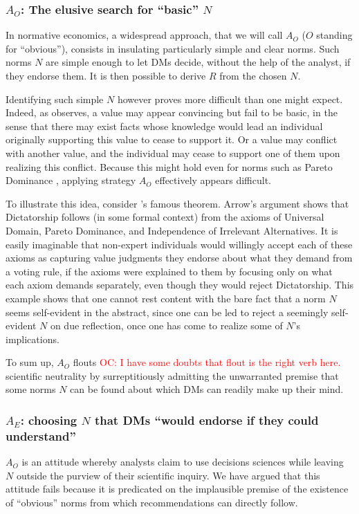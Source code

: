 \documentclass[preprint, french, english, 11pt, authoryear]{elsarticle}%
\newcommand{\protectforpdf}[1]{\texorpdfstring{\ensuremath{#1}}{#1}}
\newcommand{\commentOC}[1]{\textcolor{red}{OC: #1}}
\begin{document}
\subsubsection{\texorpdfstring{$A_O$}{AO}: The elusive search for ``basic'' \protectforpdf{N}}
In normative economics, a widespread approach, that we will call $A_O$ ($O$ standing for “obvious”), consists in insulating particularly simple and clear norms. Such norms $N$ are simple enough to let \acp{DM} decide, without the help of the analyst, if they endorse them. It is then possible to derive $R$ from the chosen $N$.

Identifying such simple $N$ however proves more difficult than one might expect. Indeed, as \citet{sen_nature_1967} observes, a value may appear convincing but fail to be basic, in the sense that there may exist facts whose knowledge would lead an individual originally supporting this value to cease to support it. Or a value may conflict with another value, and the individual may cease to support one of them upon realizing this conflict. Because this might hold even for norms such as Pareto Dominance \citep[ch. 5 and 6]{sen_collective_1984}, applying strategy $A_O$ effectively appears difficult.

To illustrate this idea, consider \citeauthor{arrow_social_2012}’s \citeyearpar{arrow_social_2012} famous theorem. Arrow's argument shows that Dictatorship follows (in some formal context) from the axioms of Universal Domain, Pareto Dominance, and Independence of Irrelevant Alternatives. It is easily imaginable that non-expert individuals would willingly accept each of these axioms as capturing value judgments they endorse about what they demand from a voting rule, if the axioms were explained to them by focusing only on what each axiom demands separately, even though they would reject Dictatorship. This example shows that one cannot rest content with the bare fact that a norm $N$ seems self-evident in the abstract, since one can be led to reject a seemingly self-evident $N$ on due reflection, once one has come to realize some of $N$'s implications.

To sum up, $A_O$ flouts \commentOC{I have some doubts that flout is the right verb here.} scientific neutrality by surreptitiously admitting the unwarranted premise that 
some norms $N$ can be found about which \acp{DM} can readily make up their mind.

\subsubsection{\texorpdfstring{$A_E$}{AE}: choosing \protectforpdf{N} that \acp{DM} “would endorse if they could understand”}
$A_O$ is an attitude whereby analysts claim to use decisions sciences while leaving $N$ outside the purview of their scientific inquiry. We have argued that this attitude fails because it is predicated on the implausible premise of the existence of “obvious” norms from which recommendations can directly follow.
\end{document}
